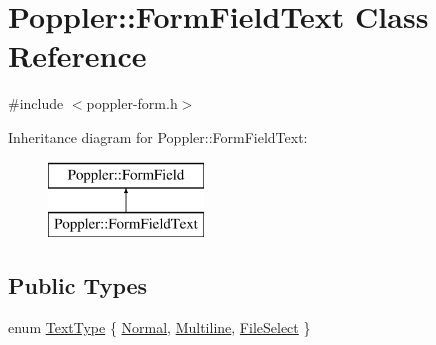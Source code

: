 \hypertarget{class_poppler_1_1_form_field_text}{}\section{Poppler\+:\+:Form\+Field\+Text Class Reference}
\label{class_poppler_1_1_form_field_text}


{\ttfamily \#include $<$poppler-\/form.\+h$>$}

Inheritance diagram for Poppler\+:\+:Form\+Field\+Text\+:\begin{figure}[H]
\begin{center}
\leavevmode
\includegraphics[height=2.000000cm]{class_poppler_1_1_form_field_text}
\end{center}
\end{figure}
\subsection*{Public Types}
\begin{DoxyCompactItemize}
\item 
enum \hyperlink{class_poppler_1_1_form_field_text_a0d67d9badab136dba73e75d3d1d945c2}{Text\+Type} \{ \hyperlink{class_poppler_1_1_form_field_text_a0d67d9badab136dba73e75d3d1d945c2a79728b8d41a5fd57768a9b81f3f45b79}{Normal}, 
\hyperlink{class_poppler_1_1_form_field_text_a0d67d9badab136dba73e75d3d1d945c2a65db192b97fc4921c37f2e600d21dd81}{Multiline}, 
\hyperlink{class_poppler_1_1_form_field_text_a0d67d9badab136dba73e75d3d1d945c2ae1ca658a5cfc13a17ecec3a9d9d3a8eb}{File\+Select}
 \}
\end{DoxyCompactItemize}
